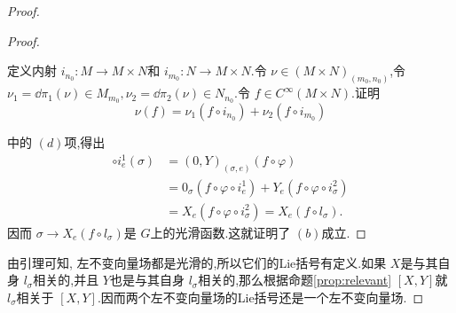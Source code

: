 \begin{proof}
\begin{proof}
\begin{exam}
\begin{enumerate}[label=(\alph*),font=\upshape]
                定义内射 $i_{n_0}\colon M\to M\times N$和 $i_{m_0}\colon N\to M\times N$.令 $\nu\in (M\times N)_{(m_0,n_0)}$,令 $\nu_1=\dd \pi_1 (\nu)\in M_{m_0},\nu_2=\dd \pi_2 (\nu)\in N_{n_0}$.令 $f\in C^\infty (M\times N)$.证明
                \[\nu (f)=\nu_1 (f\circ i_{n_0})+\nu_2 (f\circ i_{m_0})\]
            \end{enumerate}
        \end{exam}
        中的 $(d)$项,得出
        \begin{align*}
            [(0,Y)(f\circ \varphi)]\circ i_e^1(\sigma) &=(0,Y)_{(\sigma,e)}(f\circ \varphi)\\ 
            &=0_\sigma (f\circ \varphi\circ i_e^1)+Y_e(f\circ \varphi\circ i_\sigma^2)\\ 
            &=X_e(f\circ\varphi\circ i_\sigma^2)=X_e(f\circ l_\sigma).
        \end{align*}
        因而 $\sigma\to X_e (f\circ l_\sigma)$是 $G$上的光滑函数.这就证明了 $(b)$成立.
    \end{proof}
    由引理可知, 左不变向量场都是光滑的,所以它们的Lie括号有定义.如果 $X$是与其自身 $l_\sigma$相关的,并且 $Y$也是与其自身 $l_\sigma$相关的,那么根据命题\ref{prop:relevant}
    $[X,Y]$就 $l_\sigma$相关于 $[X,Y]$.因而两个左不变向量场的Lie括号还是一个左不变向量场.
\end{proof}

